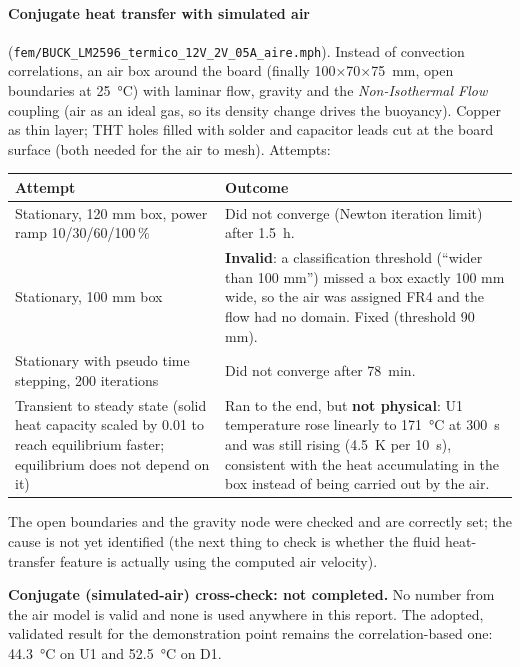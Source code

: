 \documentclass[11pt,letterpaper]{article}
\begin{document}
\paragraph{Conjugate heat transfer with simulated air} (\nolinkurl{fem/BUCK_LM2596_termico_12V_2V_05A_aire.mph}).
Instead of convection correlations, an air box around the board (finally
\SI{100}{}$\times$\SI{70}{}$\times$\SI{75}{\milli\meter}, open boundaries at \SI{25}{\celsius}) with
laminar flow, gravity and the \textit{Non-Isothermal Flow} coupling (air as an ideal gas, so its density
change drives the buoyancy). Copper as thin layer; THT holes filled with solder and capacitor leads cut
at the board surface (both needed for the air to mesh). Attempts:
\begin{center}
\small
\begin{tabular}{@{}p{6.3cm}p{8.2cm}@{}}
\toprule
Attempt & Outcome \\
\midrule
Stationary, 120 mm box, power ramp 10/30/60/100\,\% & Did not converge (Newton iteration limit) after \SI{1.5}{\hour}. \\
Stationary, 100 mm box & \textbf{Invalid}: a classification threshold (``wider than 100 mm'') missed a box exactly 100 mm wide, so the air was assigned FR4 and the flow had no domain. Fixed (threshold 90 mm). \\
Stationary with pseudo time stepping, 200 iterations & Did not converge after \SI{78}{\minute}. \\
Transient to steady state (solid heat capacity scaled by 0.01 to reach equilibrium faster; equilibrium does not depend on it) & Ran to the end, but \textbf{not physical}: U1 temperature rose linearly to \SI{171}{\celsius} at \SI{300}{\second} and was still rising (\SI{4.5}{\kelvin} per \SI{10}{\second}), consistent with the heat accumulating in the box instead of being carried out by the air. \\
\bottomrule
\end{tabular}
\end{center}
The open boundaries and the gravity node were checked and are correctly set; the cause is not yet
identified (the next thing to check is whether the fluid heat-transfer feature is actually using the
computed air velocity).

\begin{pending}
\textbf{Conjugate (simulated-air) cross-check: not completed.} No number from the air model is valid and
none is used anywhere in this report. The adopted, validated result for the demonstration point remains
the correlation-based one: \SI{44.3}{\celsius} on U1 and \SI{52.5}{\celsius} on D1.
\end{pending}
\end{document}
